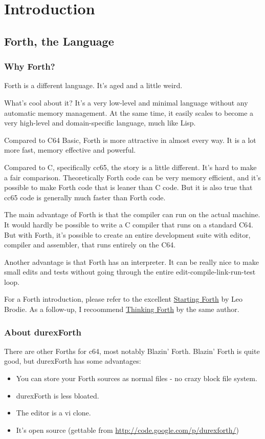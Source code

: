 \chapter{Introduction}

\section{Forth, the Language}

\subsection{Why Forth?}

Forth is a different language. It's aged and a little weird.

What's cool about it? It's a very low-level and minimal language without any automatic memory management. At the same time, it easily scales to become a very high-level and domain-specific language, much like Lisp. 

Compared to C64 Basic, Forth is more attractive in almost every way. It is a lot more fast, memory effective and powerful.

Compared to C, specifically cc65, the story is a little different. It's hard to make a fair comparison. Theoretically Forth code can be very memory efficient, and it's possible to make Forth code that is leaner than C code. But it is also true that cc65 code is generally much faster than Forth code.

The main advantage of Forth is that the compiler can run on the actual machine. It would hardly be possible to write a C compiler that runs on a standard C64. But with Forth, it's possible to create an entire development suite with editor, compiler and assembler, that runs entirely on the C64.

Another advantage is that Forth has an interpreter. It can be really nice to make small edits and tests without going through the entire edit-compile-link-run-test loop.

For a Forth introduction, please refer to the excellent \href{http://www.forth.com/starting-forth/}{Starting Forth} by Leo Brodie. As a follow-up, I recoommend \href{http://thinking-forth.sourceforge.net/}{Thinking Forth} by the same author.

\subsection{About durexForth}

There are other Forths for c64, most notably Blazin' Forth. Blazin' Forth is quite good, but durexForth has some advantages:

\begin{itemize}
\item You can store your Forth sources as normal files - no crazy block file system.
\item durexForth is less bloated.
\item The editor is a vi clone.
\item It's open source (gettable from \url{http://code.google.com/p/durexforth/})
\end{itemize}
